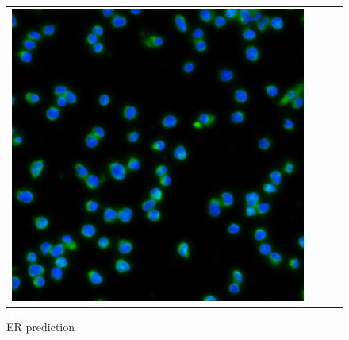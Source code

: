 \begin{figure}[H]
\begin{tabularx}{\textwidth}{YYYY}
            \includegraphics{bilder/ER/gt_nuclei.jpg}
        \end{tabularx}
    \caption{ER prediction}
    \label{fig:er-prediction}
\end{figure}
